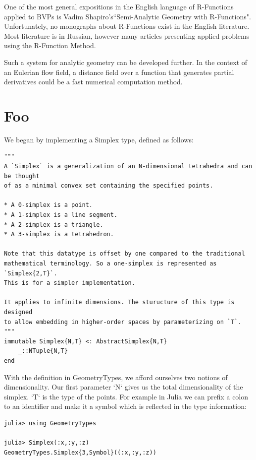One of the most general expositions in the English language of R-Functions
applied to BVPs is
Vadim Shapiro's``Semi-Analytic Geometry with R-Functions". \cite{shapiro2007semi}
Unfortunately, no monographs about R-Functions exist in the English literature.
Most literature is in Russian, however many articles presenting applied
problems using the R-Function Method. \cite{voron2010}

Such a system for analytic geometry can be developed further. In the context
of an Eulerian flow field, a distance field over a function that
generates partial derivatives could be a fast numerical computation method.

\chapter{Foo}


We began by implementing a Simplex type, defined as follows:

\begin{lstlisting}
"""
A `Simplex` is a generalization of an N-dimensional tetrahedra and can be thought
of as a minimal convex set containing the specified points.

* A 0-simplex is a point.
* A 1-simplex is a line segment.
* A 2-simplex is a triangle.
* A 3-simplex is a tetrahedron.

Note that this datatype is offset by one compared to the traditional
mathematical terminology. So a one-simplex is represented as `Simplex{2,T}`.
This is for a simpler implementation.

It applies to infinite dimensions. The sturucture of this type is designed
to allow embedding in higher-order spaces by parameterizing on `T`.
"""
immutable Simplex{N,T} <: AbstractSimplex{N,T}
    _::NTuple{N,T}
end
\end{lstlisting}

With the definition in GeometryTypes, we afford ourselves two notions of
dimensionality. Our first parameter `N` gives us the total dimensionality
of the simplex. `T` is the type of the points. For example in Julia we can
prefix a colon to an identifier and make it a symbol which is reflected
in the type information:

\begin{lstlisting}
julia> using GeometryTypes

julia> Simplex(:x,:y,:z)
GeometryTypes.Simplex{3,Symbol}((:x,:y,:z))
\end{lstlisting}

